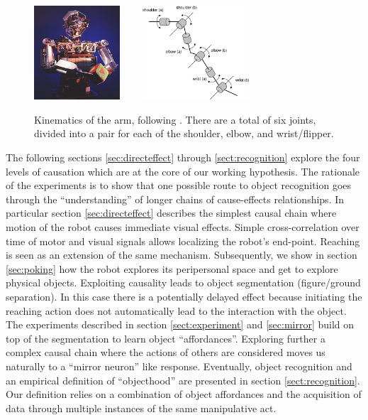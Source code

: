 \ifverbose
\begin{figure}[tbh]
\begin{center}
\includegraphics[height=3.5cm]{cog5-flip.eps}
\ \ \ \ 
\includegraphics[height=3.5cm]{arm-motors.eps}
\caption{ 
%
Kinematics of the arm, following \protect\cite{williamson99robot}.
There are a total of six joints, divided into a pair for each of
the shoulder, elbow, and wrist/flipper.
%
}
\label{fig:arm-motors}
\end{center}
\end{figure}
\fi

\ifrev
The following sections \ref{sec:directeffect} through \ref{sect:recognition} 
explore the four levels of causation which are at the core of 
our working hypothesis. The rationale of the experiments is to show
that one possible route to object recognition goes through the
``understanding'' of longer chains of cause-effects relationships.
In particular section \ref{sec:directeffect} describes the simplest causal
chain where motion of the robot causes immediate visual effects. Simple
cross-correlation over time of motor and visual signals allows localizing
the robot's end-point. Reaching is seen as an extension of the same
mechanism. 
Subsequently, we show in section \ref{sec:poking} how the robot 
explores its peripersonal space and get to explore physical objects.
Exploiting causality leads to object segmentation 
(figure/ground separation). In this case there is a potentially
delayed effect because initiating the reaching action does not
automatically lead to the interaction with the object.
The experiments described in section \ref{sect:experiment} and 
\ref {sec:mirror} build on top of the segmentation to learn object 
``affordances''. Exploring further a complex causal chain where
the actions of others are considered moves us naturally to 
a ``mirror neuron'' like response.
Eventually, object recognition and an empirical definition of
``objecthood'' are presented in section \ref{sect:recognition}.
Our definition relies on a combination of object affordances and 
the acquisition of data through multiple instances of the same 
manipulative act.
\fi